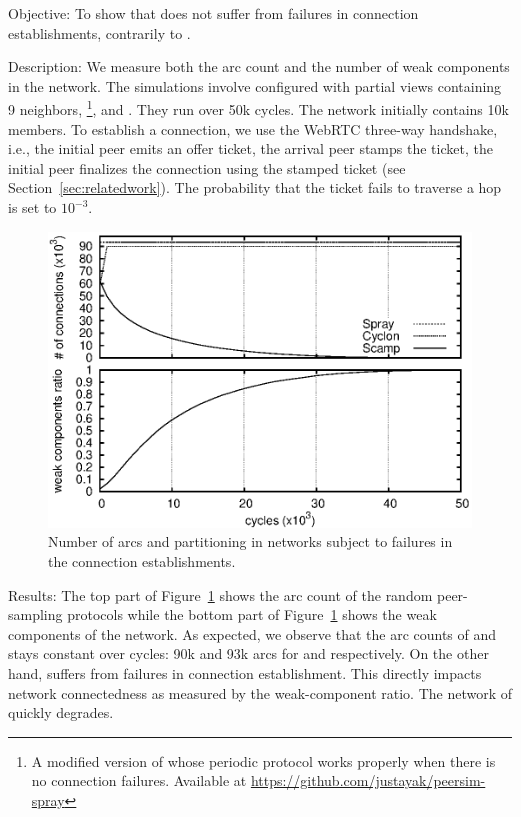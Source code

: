 \begin{asparadesc}
\item[Objective:] To show that \SPRAY does not suffer from failures in
  connection establishments, contrarily to \SCAMP.
\item[Description:] We measure both the arc count and the number of weak
  components in the network. The simulations involve \CYCLON configured with
  partial views containing 9 neighbors, \SCAMP\footnote{A modified version of
    \SCAMP whose periodic protocol works properly when there is no connection
    failures. Available at \url{https://github.com/justayak/peersim-spray}}, and
  \SPRAY. They run over 50k cycles. The network initially contains 10k members.
  To establish a connection, we use the WebRTC three-way handshake, i.e., the
  initial peer emits an offer ticket, the arrival peer stamps the ticket, the
  initial peer finalizes the connection using the stamped ticket (see
  Section~\ref{sec:relatedwork}). The probability that the ticket fails to
  traverse a hop is set to $10^{-3}$.

\begin{figure}
  \centering \includegraphics[width=\SCALE\textwidth]{img/degen.eps}
  \caption{\label{fig:degeneration}Number of arcs and partitioning in networks
    subject to failures in the connection establishments.}
\end{figure}

\item[Results:] The top part of Figure~\ref{fig:degeneration} shows the arc
  count of the random peer-sampling protocols while the bottom part of
  Figure~\ref{fig:degeneration} shows the weak components of the network.  As
  expected, we observe that the arc counts of \CYCLON and \SPRAY stays constant
  over cycles: 90k and 93k arcs for \CYCLON and \SPRAY respectively. On the
  other hand, \SCAMP suffers from failures in connection establishment. This
  directly impacts network connectedness as measured by the weak-component
  ratio. The network of \SCAMP quickly degrades.


\end{asparadesc}
